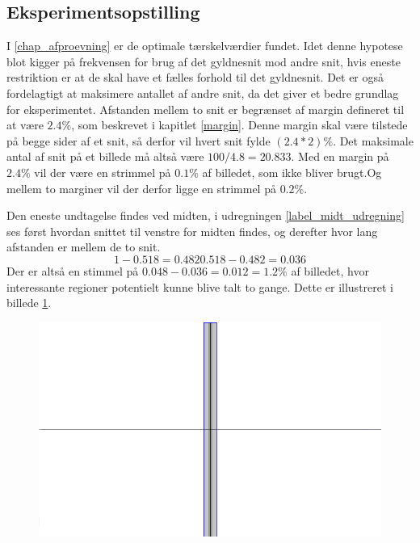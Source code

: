 {\subsection{Eksperimentsopstilling}
I \ref{chap_afproevning} er de optimale tærskelværdier fundet.  Idet
denne hypotese blot kigger på frekvensen for brug af det gyldnesnit mod
andre snit, hvis eneste restriktion er at de skal have et fælles forhold
til det gyldnesnit.  Det er også fordelagtigt at maksimere antallet af
andre snit, da det giver et bedre grundlag for eksperimentet.  Afstanden
mellem to snit er begrænset af margin defineret til at være
$2.4\%$, som beskrevet i kapitlet \ref{margin}.  Denne margin skal være tilstede på begge sider af
et snit, så derfor vil hvert snit fylde $(2.4*2)\%$.  Det maksimale
antal af snit på et billede må altså være $100/4.8=20.833$.
Med en margin på $2.4\%$ vil der være en strimmel på $0.1\%$ af
billedet, som ikke bliver brugt.Og mellem to marginer vil der derfor ligge en
strimmel på $0.2\%$. 

Den eneste undtagelse findes ved midten, i udregningen
\ref{label_midt_udregning} ses først hvordan snittet til venstre for
midten findes, og derefter hvor lang afstanden er mellem de to snit.
\begin{equation}\label{resul_midt_udregningen}
    1-0.518 = 0.482
    0.518-0.482 = 0.036
\end{equation}
Der er altså en stimmel på $0.048-0.036 = 0.012 = 1.2\%$ af
billedet, hvor interessante regioner potentielt kunne blive talt to gange.
Dette er illustreret i billede \ref{resultat_fejl_midt}.
\begin{figure}[!h]
	\centering
	\includegraphics[scale=0.5]{afsnit/resultater/billeder/midt_strimmel}
	\label{resultat_fejl_midt}
\end{figure}

}
